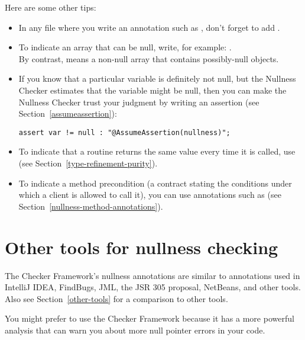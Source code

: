Here are some other tips:
\begin{itemize}
\item
    \begin{sloppypar}
    In any file where you write an annotation such as ,
    don't forget to add .
    \end{sloppypar}
\item
    To indicate an array that can be null, write, for example: . \\
    By contrast,  means a non-null array that
    contains possibly-null objects.
\item
    If you know that a particular variable is definitely not null, but the
    Nullness Checker estimates that the variable might be null, then you can
    make the Nullness Checker trust your judgment by writing
    an assertion (see Section~\ref{assumeassertion}):
\begin{Verbatim}
assert var != null : "@AssumeAssertion(nullness)";
\end{Verbatim}
\item
    To indicate that a routine returns the same value every time it is
    called, use  (see Section~\ref{type-refinement-purity}).
\item
    To indicate a method precondition (a contract stating the conditions
    under which a client is allowed to call it), you can use annotations
    such as  (see Section~\ref{nullness-method-annotations}).
\end{itemize}



\section{Other tools for nullness checking\label{nullness-related-work}}

\newcommand{\linktoNonNull}{\refclass{checker/nullness/qual}{NonNull}}
\newcommand{\linktoNullable}{\refclass{checker/nullness/qual}{Nullable}}

The Checker Framework's nullness annotations are similar to annotations used
in IntelliJ IDEA, FindBugs, JML, the JSR 305 proposal, NetBeans, and other tools.  Also
see Section~\ref{other-tools} for a comparison to other tools.

You might prefer to use the Checker Framework because it has a more
powerful analysis that can warn you about more null pointer errors in your
code.

